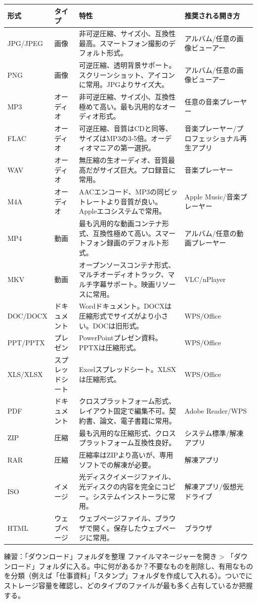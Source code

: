 \begin{center}
\begin{tabularx}{\linewidth}{|X|X|X|X|}
\hline
\textbf{形式} & \textbf{タイプ} & \textbf{特性} & \textbf{推奨される開き方} \tabularnewline
\hline
JPG/JPEG & 画像 & 非可逆圧縮、サイズ小、互換性最高。スマートフォン撮影のデフォルト形式。 & アルバム/任意の画像ビューアー \tabularnewline
PNG & 画像 & 可逆圧縮、透明背景サポート。スクリーンショット、アイコンに常用。JPGよりサイズ大。 & アルバム/任意の画像ビューアー \tabularnewline
MP3 & オーディオ & 非可逆圧縮、サイズ小、互換性極めて高い。最も汎用的なオーディオ形式。 & 任意の音楽プレーヤー \tabularnewline
FLAC & オーディオ & 可逆圧縮、音質はCDと同等、サイズはMP3の3-5倍。オーディオマニアの第一選択。 & 音楽プレーヤー/プロフェッショナル再生アプリ \tabularnewline
WAV & オーディオ & 無圧縮の生オーディオ、音質最高だがサイズ巨大。プロ録音に常用。 & 音楽プレーヤー \tabularnewline
M4A & オーディオ & AACエンコード、MP3の同ビットレートより音質が良い。Appleエコシステムで常用。 & Apple Music/音楽プレーヤー \tabularnewline
MP4 & 動画 & 最も汎用的な動画コンテナ形式、互換性極めて高い。スマートフォン録画のデフォルト形式。 & アルバム/任意の動画プレーヤー \tabularnewline
MKV & 動画 & オープンソースコンテナ形式、マルチオーディオトラック、マルチ字幕サポート。映画リソースに常用。 & VLC/nPlayer \tabularnewline
DOC/DOCX & ドキュメント & Wordドキュメント。DOCXは圧縮形式でサイズがより小さい。DOCは旧形式。 & WPS/Office \tabularnewline
PPT/PPTX & プレゼン & PowerPointプレゼン資料。PPTXは圧縮形式。 & WPS/Office \tabularnewline
XLS/XLSX & スプレッドシート & Excelスプレッドシート。XLSXは圧縮形式。 & WPS/Office \tabularnewline
PDF & ドキュメント & クロスプラットフォーム形式、レイアウト固定で編集不可。契約書、論文、電子書籍に常用。 & Adobe Reader/WPS \tabularnewline
ZIP & 圧縮 & 最も汎用的な圧縮形式、クロスプラットフォーム互換性良好。 & システム標準/解凍アプリ \tabularnewline
RAR & 圧縮 & 圧縮率はZIPより高いが、専用ソフトでの解凍が必要。 & 解凍アプリ \tabularnewline
ISO & イメージ & 光ディスクイメージファイル、光ディスクの内容を完全にコピー。システムインストーラに常用。 & 解凍アプリ/仮想光ドライブ \tabularnewline
HTML & ウェブページ & ウェブページファイル、ブラウザで開く。保存したウェブページに常用。 & ブラウザ \tabularnewline
\hline
\end{tabularx}
\end{center}

\begin{tcbpractice}{練習：「ダウンロード」フォルダを整理}
ファイルマネージャーを開き > 「ダウンロード」フォルダに入る。中に何があるか？不要なものを削除し、有用なものを分類（例えば「仕事資料」「スタンプ」フォルダを作成して入れる）。ついでにストレージ容量を確認し、どのタイプのファイルが最も多く占有しているか把握する。

\end{tcbpractice}

